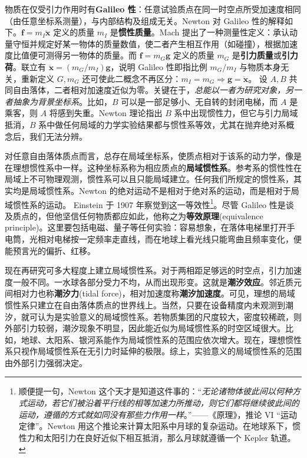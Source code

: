 物质在仅受引力作用时有\textbf{Galileo 性}：任意试验质点在同一时空点所受加速度相同（由任意坐标系测量），与内部结构及组成无关。Newton 对 Galileo 性的解释如下。$\bm f=m_I\ddot{\bm x}$ 定义的质量 $m_I$ 是\textbf{惯性质量}。Mach 提出了一种测量性定义：承认动量守恒并规定好某一物体的质量数值，使二者产生相互作用（如碰撞），根据加速度比值便可测得另一物体的质量。而 $\bm f=m_G\bm g $ 定义的质量 $m_G$ 是\textbf{引力质量}或\textbf{引力荷}。联立有 $\ddot{\bm x}=(m_G/m_I)\bm g $，说明 Galileo 性即指比例 $m_G/m_I$ 与物质本身无关，重新定义 $G,m_G$ 还可使此二概念不再区分：$m_I=m_G\Rightarrow\bm g =\ddot{\bm x}$。
设 $A,B$ 共同自由落体，二者相对加速度近似为零。关键在于，\textit{总能以一者为研究对象，另一者抽象为背景坐标系}。比如，$B$ 可以是一部足够小、无自转的封闭电梯，而 $A$ 是乘客，则 $A$ 将感到失重。Newton 理论指出 $B$ 系中出现惯性力，但它与引力局域抵消，$B$ 系中做任何局域的力学实验结果都与惯性系等效，尤其在抛弃绝对系概念后，我们无法分辨。

对任意自由落体质点而言，总存在局域坐标系，使质点相对于该系的动力学，像是在理想惯性系中一样。这种坐标系称为相应质点的\textbf{局域惯性系}。参考系的惯性性在局域上不可物理观测，惯性系可以且只能局域建立。任何我们所规定的惯性系，其实均是局域惯性系。Newton 的绝对运动不是相对于绝对系的运动，而是相对于局域惯性系的运动。
Einstein 于 1907 年察觉到这一等效性\footnote{顺便提一句，Newton 这个天才是知道这件事的：“\textit{无论诸物体彼此间以何种方式运动，若它们被沿着平行线的相等加速力所推动，则它们都将继续彼此间的运动，遵循的方式就如同没有那些力作用一样}。”——《原理》，推论 VI “运动定律”\cite{Principia}。Newton 用这个推论来计算太阳系中月球的复杂运动。在地球系下，惯性力和太阳引力在良好近似下相互抵消，那么月球就遵循一个 Kepler 轨道。}。尽管 Galileo 性是谈及质点的，但他坚信任何物质都应如此，他称之为\textbf{等效原理}(equivalence principle)。这里要包括电磁、量子等任何实验：容易想象，在落体电梯里打开手电筒，光相对电梯按一定频率走直线，而在地球上看光线只能弯曲且频率变化，便能预言光的偏折、红移。

现在再研究可多大程度上建立局域惯性系。对于两相距足够远的时空点，引力加速度一般不同。一水球各部分受力不均，从而出现形变。这就是\textbf{潮汐效应}。邻近质元间相对力也称\textbf{潮汐力}(tidal force)，相对加速度称\textbf{潮汐加速度}。可见，理想的局域惯性系只建立在自由落体质点的世界线上。当然，只要在设备精度内未观测到潮汐，就可认为是实验意义的局域惯性系。若物质集团的尺度较大，密度较稀疏，则外部引力较弱，潮汐现象不明显，因此能近似为局域惯性系的时空区域很大。比如，地球、太阳系、银河系能作为局域惯性系的范围应依次增大。现在，理想惯性系只视作局域惯性系在无引力时延伸的极限。综上，实验意义的局域惯性系的范围由外部引力强弱决定。

